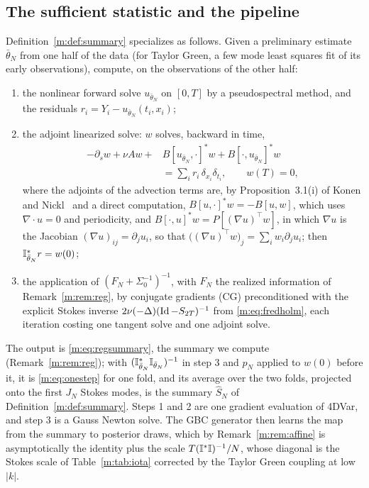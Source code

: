 \subsection{The sufficient statistic and the pipeline}

Definition~\ref{m:def:summary} specializes as follows. Given a preliminary estimate $\bar\theta_N$ from one half of the data (for Taylor Green, a few mode least squares fit of its early observations), compute, on the observations of the other half:
\begin{enumerate}[nosep]
\item the nonlinear forward solve $u_{\bar\theta_N}$ on $[0,T]$ by a pseudospectral method, and the residuals $r_i=Y_i-u_{\bar\theta_N}(t_i,x_i)$;
\item the adjoint linearized solve: $w$ solves, backward in time,
\[
\begin{split}
-\partial_sw+\nu Aw+{}&B[u_{\bar\theta_N},\cdot]^*w+B[\cdot,u_{\bar\theta_N}]^*w\\
&=\sum_ir_i\,\delta_{x_i}\delta_{t_i},\qquad w(T)=0,
\end{split}
\]
where the adjoints of the advection terms are, by Proposition~3.1(i) of Konen and Nickl~\cite{konennickl2026} and a direct computation, $B[u,\cdot]^*w=-B[u,w]$, which uses $\nabla\cdot u=0$ and periodicity, and $B[\cdot,u]^*w=P[(\nabla u)^\top w]$, in which $\nabla u$ is the Jacobian $(\nabla u)_{ij}=\partial_ju_i$, so that $\big((\nabla u)^\top w\big)_j=\sum_i w_i\partial_ju_i$; then $\mathbb{I}^*_{\bar\theta_N}r=w(0)$;
\item the application of $(F_N+\Sigma_0^{-1})^{-1}$, with $F_N$ the realized information of Remark~\ref{m:rem:reg}, by conjugate gradients (CG) preconditioned with the explicit Stokes inverse $2\nu(-\Delta)(\operatorname{Id}-S_{2T})^{-1}$ from \eqref{m:eq:fredholm}, each iteration costing one tangent solve and one adjoint solve.
\end{enumerate}
The output is \eqref{m:eq:regsummary}, the summary we compute (Remark~\ref{m:rem:reg}); with $(\mathbb{I}^*_{\bar\theta_N}\mathbb{I}_{\bar\theta_N})^{-1}$ in step 3 and $p_N$ applied to $w(0)$ before it, it is \eqref{m:eq:onestep} for one fold, and its average over the two folds, projected onto the first $J_N$ Stokes modes, is the summary $\hat S_N$ of Definition~\ref{m:def:summary}. Steps 1 and 2 are one gradient evaluation of 4DVar, and step 3 is a Gauss Newton solve. The GBC generator then learns the map from the summary to posterior draws, which by Remark~\ref{m:rem:affine} is asymptotically the identity plus the scale $T(\mathbb{I}^*\mathbb{I})^{-1}/N$, whose diagonal is the Stokes scale of Table~\ref{m:tab:iota} corrected by the Taylor Green coupling at low $|k|$.

